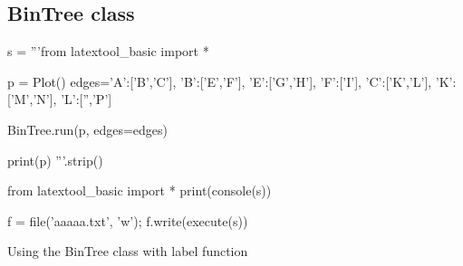 \newpage
\subsection{BinTree class}

\begin{python}
s = '''from latextool_basic import *

p = Plot()
edges={'A':['B','C'],
       'B':['E','F'],
       'E':['G','H'],
       'F':['I'],
       'C':['K','L'],
       'K':['M','N'],
       'L':['','P']}

BinTree.run(p, edges=edges)
     
print(p)
'''.strip()

from latextool_basic import *
print(console(s))

f = file('aaaaa.txt', 'w'); f.write(execute(s))
\end{python}




\newpage
Using the BinTree class with label function






